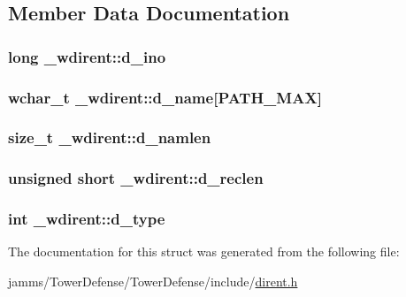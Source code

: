 \subsection{Member Data Documentation}
\hypertarget{struct__wdirent_ac8cfaf294a0b6a49287d3f384c280c93}{
\subsubsection[{d\+\_\+ino}]{\setlength{\rightskip}{0pt plus 5cm}long \+\_\+wdirent\+::d\+\_\+ino}}\label{struct__wdirent_ac8cfaf294a0b6a49287d3f384c280c93}
\hypertarget{struct__wdirent_a267f915cd36cad5969337a9192cab567}{
\subsubsection[{d\+\_\+name}]{\setlength{\rightskip}{0pt plus 5cm}wchar\+\_\+t \+\_\+wdirent\+::d\+\_\+name\mbox{[}{\bf P\+A\+T\+H\+\_\+\+M\+A\+X}\mbox{]}}}\label{struct__wdirent_a267f915cd36cad5969337a9192cab567}
\hypertarget{struct__wdirent_a0050d6131e6fa90206903e216b38799e}{
\subsubsection[{d\+\_\+namlen}]{\setlength{\rightskip}{0pt plus 5cm}size\+\_\+t \+\_\+wdirent\+::d\+\_\+namlen}}\label{struct__wdirent_a0050d6131e6fa90206903e216b38799e}
\hypertarget{struct__wdirent_aff7f360608e576cd18cf11f2caf13ef3}{
\subsubsection[{d\+\_\+reclen}]{\setlength{\rightskip}{0pt plus 5cm}unsigned short \+\_\+wdirent\+::d\+\_\+reclen}}\label{struct__wdirent_aff7f360608e576cd18cf11f2caf13ef3}
\hypertarget{struct__wdirent_a3c3874604ffccbeeaffd96709763cc3b}{
\subsubsection[{d\+\_\+type}]{\setlength{\rightskip}{0pt plus 5cm}int \+\_\+wdirent\+::d\+\_\+type}}\label{struct__wdirent_a3c3874604ffccbeeaffd96709763cc3b}


The documentation for this struct was generated from the following file\+:\begin{DoxyCompactItemize}
\item 
jamms/\+Tower\+Defense/\+Tower\+Defense/include/\hyperlink{dirent_8h}{dirent.\+h}\end{DoxyCompactItemize}
